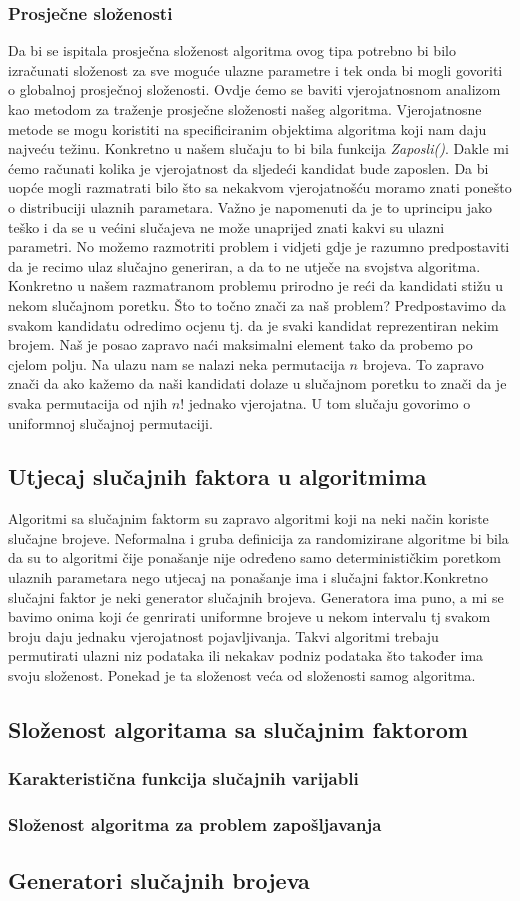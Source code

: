 \documentclass[10pt,a4paper]{article}
\begin{document}
\subsubsection*{Prosječne složenosti}
Da bi se ispitala prosječna složenost algoritma ovog tipa potrebno bi bilo izračunati složenost za sve 
moguće ulazne parametre i tek onda bi mogli govoriti o globalnoj prosječnoj složenosti. Ovdje ćemo se 
baviti vjerojatnosnom analizom kao metodom za traženje prosječne složenosti našeg algoritma. Vjerojatnosne 
metode se mogu koristiti na specificiranim objektima algoritma koji nam daju najveću težinu. Konkretno u našem 
slučaju to bi bila funkcija \textit{Zaposli()}. Dakle mi ćemo računati kolika je vjerojatnost da sljedeći kandidat 
bude zaposlen. Da bi uopće mogli razmatrati bilo što sa nekakvom vjerojatnošću moramo znati ponešto o distribuciji
ulaznih parametara. Važno je napomenuti da je to uprincipu jako teško i da se u većini slučajeva ne može unaprijed
znati kakvi su ulazni parametri. No možemo razmotriti problem i vidjeti gdje je razumno predpostaviti da je recimo
ulaz slučajno generiran, a da to ne utječe na svojstva algoritma. Konkretno u našem razmatranom problemu prirodno
je reći da kandidati stižu u nekom slučajnom poretku. Što to točno znači za naš problem?
Predpostavimo da svakom kandidatu odredimo ocjenu tj. da je svaki kandidat reprezentiran nekim brojem. Naš je posao 
zapravo naći maksimalni element tako da probemo po cjelom polju. Na ulazu nam se nalazi neka permutacija $n$ brojeva. 
To zapravo znači da ako kažemo da naši kandidati dolaze u slučajnom poretku to znači da je svaka permutacija od njih $n!$ 
jednako vjerojatna. U tom slučaju govorimo o uniformnoj slučajnoj permutaciji.

\subsection{Utjecaj slučajnih faktora u algoritmima}
Algoritmi sa slučajnim faktorm su zapravo algoritmi koji na neki način koriste slučajne brojeve. Neformalna i gruba definicija 
za randomizirane algoritme bi bila da su to algoritmi čije ponašanje nije određeno samo determinističkim poretkom ulaznih 
parametara nego utjecaj na ponašanje ima i slučajni faktor.Konkretno slučajni faktor je neki generator slučajnih brojeva. 
Generatora ima puno, a mi se bavimo onima koji će genrirati uniformne brojeve u nekom intervalu tj svakom broju daju jednaku 
vjerojatnost pojavljivanja. Takvi algoritmi trebaju permutirati ulazni niz podataka ili nekakav podniz podataka što također 
ima svoju složenost. Ponekad je ta složenost veća od složenosti samog algoritma.

\subsection{Složenost algoritama sa slučajnim faktorom}
\subsubsection{Karakteristična funkcija slučajnih varijabli}
\subsubsection{Složenost algoritma za problem zapošljavanja}

\subsection{Generatori slučajnih brojeva}

\end{document}
